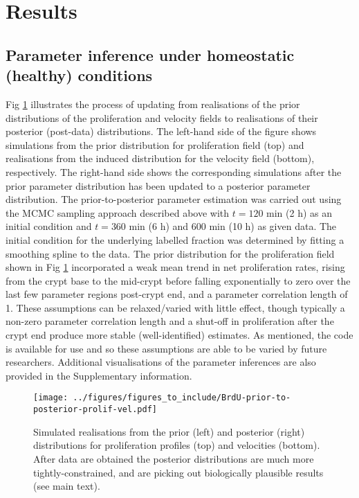 \documentclass[10pt,letterpaper]{article}
\begin{document}
\section{Results}\label{results}

\subsection{Parameter inference under homeostatic (healthy)
conditions}\label{parameter-inference-under-homeostatic-healthy-conditions}

Fig \ref{fig:BrdU-prior-to-posterior-prolif-vel} illustrates the process
of updating from realisations of the prior distributions of the
proliferation and velocity fields to realisations of their posterior
(post-data) distributions. The left-hand side of the figure shows
simulations from the prior distribution for proliferation field (top)
and realisations from the induced distribution for the velocity field
(bottom), respectively. The right-hand side shows the corresponding
simulations after the prior parameter distribution has been updated to a
posterior parameter distribution. The prior-to-posterior parameter
estimation was carried out using the MCMC sampling approach described
above with \(t = 120\) min (2 h) as an initial condition and \(t = 360\)
min (6 h) and \(600\) min (10 h) as given data. The initial condition
for the underlying labelled fraction was determined by fitting a
smoothing spline to the data. The prior distribution for the
proliferation field shown in Fig
\ref{fig:BrdU-prior-to-posterior-prolif-vel} incorporated a weak mean
trend in net proliferation rates, rising from the crypt base to the
mid-crypt before falling exponentially to zero over the last few
parameter regions post-crypt end, and a parameter correlation length of
1. These assumptions can be relaxed/varied with little effect, though
typically a non-zero parameter correlation length and a shut-off in
proliferation after the crypt end produce more stable (well-identified)
estimates. As mentioned, the code is available for use and so these
assumptions are able to be varied by future researchers. Additional
visualisations of the parameter inferences are also provided in the
Supplementary information.

\begin{figure}
\centering
\texttt{[image: ../figures/figures\_to\_include/BrdU-prior-to-posterior-prolif-vel.pdf]}
\caption{Simulated realisations from the prior (left) and posterior
(right) distributions for proliferation profiles (top) and velocities
(bottom). After data are obtained the posterior distributions are much
more tightly-constrained, and are picking out biologically plausible
results (see main text).\label{fig:BrdU-prior-to-posterior-prolif-vel}}
\end{figure}
\end{document}
